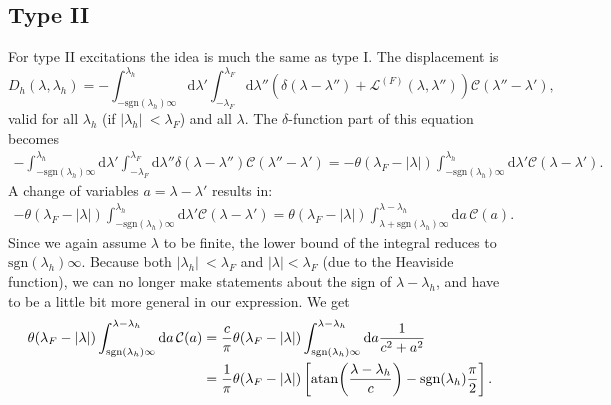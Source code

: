 \documentclass[11pt, a4paper,draft]{report} %
\newcommand{\inversetruncc}{\mathcal{L}}
\newcommand{\kernel}{\mathcal{C}}
\begin{document}
\subsection{Type II}
For type II excitations the idea is much the same as type I. The displacement is
\begin{equation}
	D_h(\lambda, \lambda_h) = - \int_{-\textrm{sgn}(\lambda_h)\infty}^{\lambda_h} \mathrm{d}\lambda' \int_{-\lambda_F}^{\lambda_F} \textrm{d} \lambda'' \left(\delta(\lambda-\lambda'') + \inversetruncc^{(F)}(\lambda,\lambda'') \right)\kernel(\lambda''-\lambda'),
\end{equation}
valid for all \(\lambda_h\) (if \(\lvert \lambda_h \rvert\ < \lambda_F\)) and all \(\lambda\).
The \(\delta\)-function part of this equation becomes
\begin{align}
	-\int_{-\textrm{sgn}(\lambda_h)\infty}^{\lambda_h} \mathrm{d}\lambda' \int_{-\lambda_F}^{\lambda_F} \textrm{d} \lambda'' \delta(\lambda-\lambda'') \kernel(\lambda''-\lambda') 
		= - \theta(\lambda_F - \lvert \lambda \rvert) \int_{-\textrm{sgn}(\lambda_h)\infty}^{\lambda_h} \mathrm{d}\lambda'     \kernel(\lambda-\lambda').
\end{align}
A change of variables \(a=\lambda-\lambda'\) results in:
\begin{align}
	 - \theta(\lambda_F - \lvert \lambda \rvert) \int_{-\textrm{sgn}(\lambda_h)\infty}^{\lambda_h} \mathrm{d}\lambda'     \kernel(\lambda-\lambda') = 
	  \theta(\lambda_F - \lvert \lambda \rvert) \int_{\lambda+\textrm{sgn}(\lambda_h)\infty}^{\lambda-\lambda_h} \mathrm{d}a \, \kernel(a).
\end{align}
Since we again assume \(\lambda\) to be finite, the lower bound of the integral reduces to \(\textrm{sgn}(\lambda_h)\infty\).
Because both \(\lvert \lambda_h \rvert\ < \lambda_F\) and \(\lvert\lambda\rvert < \lambda_F\) (due to the Heaviside function), we can no longer make statements about the sign of \(\lambda-\lambda_h\), and have to be a little bit more general in our expression.
We get
\begin{align}
	  \theta(\lambda_F - \lvert \lambda \rvert) \int_{\textrm{sgn}(\lambda_h)\infty}^{\lambda-\lambda_h} \mathrm{d}a \, \kernel(a) &=
	  \frac{c}{\pi}\theta(\lambda_F - \lvert \lambda \rvert) \int_{\textrm{sgn}(\lambda_h)\infty}^{\lambda-\lambda_h} \mathrm{d}a \frac{1}{c^2 + a^2}\\
	  &= \frac{1}{\pi}\theta(\lambda_F - \lvert \lambda \rvert) \left[ \atan(\frac{\lambda-\lambda_h}{c}) - \textrm{sgn}(\lambda_h)\frac{\pi}{2}\right].
\end{align}
\end{document}
